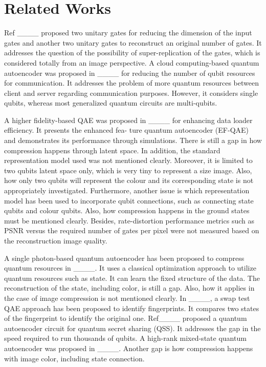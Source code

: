 \section{Related Works}
\label{L_R}
Ref ____ proposed two unitary gates for reducing the dimension of the input gates and another two unitary gates to reconstruct an original number of gates. It addresses the question of the possibility of super-replication of the gates, which is considered totally from an image perspective. A cloud computing-based quantum autoencoder was proposed in ____ for reducing the number of qubit resources for communication. It addresses the problem of more quantum resources between client and server regarding communication purposes. However, it considers single qubits, whereas most generalized quantum circuits are multi-qubits.  

A higher fidelity-based QAE was proposed in ____ for enhancing data loader efficiency. It presents the enhanced fea-
ture quantum autoencoder (EF-QAE) and demonstrates its
performance through simulations. There is still a gap in how compression happens through latent space. In addition, the standard representation model used was not mentioned clearly. Moreover, it is limited to two qubits  latent space only, which is very tiny to represent a size image. Also, how only two qubits will represent the colour and its corresponding state is not appropriately investigated. Furthermore, another issue is which representation model has been used to incorporate qubit connections, such as connecting state qubits and colour qubits. Also, how compression happens in the ground states must be mentioned clearly. Besides, rate-distortion performance metrics such as PSNR versus the required number of gates per pixel were not measured based on the reconstruction image quality. 

A single photon-based quantum autoencoder has been proposed to compress quantum resources in ____. It uses a classical optimization approach to utilize quantum resources such as state. It can learn the fixed structure of the data. The reconstruction of the state, including color, is still a gap. Also, how it applies in the case of image compression is not mentioned clearly. In ____, a swap test  QAE approach has been proposed to identify fingerprints. It compares two states of the fingerprint to identify the original one. Ref____ proposed a quantum autoencoder circuit for quantum secret sharing (QSS). It addresses the gap in the speed required to run thousands of qubits. A high-rank mixed-state quantum autoencoder was proposed in ____. Another gap is how compression happens with image color, including state connection.

